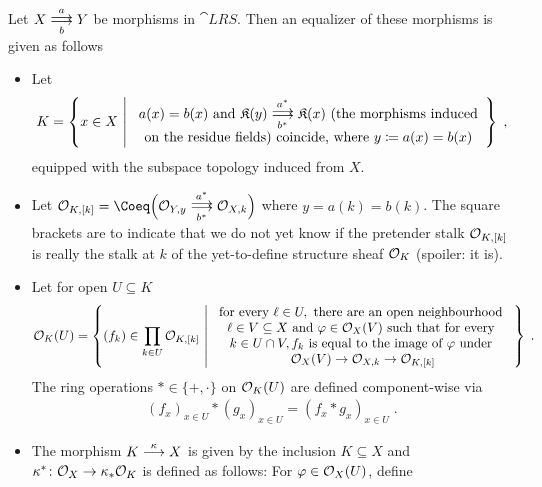 \documentclass[a4paper,parskip=half,numbers=enddot, DIV=12]{scrreprt}
\begin{document}
\begin{prop}
    Let $X\doublemorphism[a][\smash{b}] Y$ be morphisms in $\cat{LRS}$. Then an equalizer of these morphisms is given as follows
    \begin{itemize}
      \item 
        Let 
        \begin{align*}
        	K = \left\{ x\in X\st 
        	\begin{array}{c}
	        	a(x) = b(x) \text{ and }\KK(y) \doublemorphism[a^*][b^*] \KK(x)\text{ (the morphisms induced}\\
	        	\text{on the residue fields) coincide, where }y\coloneqq a(x)=b(x)
        	\end{array}\right\}\;,
        \end{align*}
        equipped with the subspace topology induced from $X$.
      \item 
        Let $\Oo_{K,[k]} = \Coeq\Big(\Oo_{Y,y} \doublemorphism[a^*][b^*] \Oo_{X,k}\Big)$ where $y=a(k) = b(k)$. The square brackets are to indicate that we do not yet know if the pretender stalk $\mathcal{O}_{K,[k]}$ is really the stalk at $k$ of the yet-to-define structure sheaf $\mathcal{O}_K$ (spoiler: it is).
      \item 
        Let for open $U\subseteq K$ 
        \begin{align*}
            \Oo_K(U) = \left\{(f_k)\in \prod_{k\in U} \Oo_{K,[k]} \st \begin{array}{c}
                \text{for every } \ell\in U, \text{ there are an open neighbourhood } \\
                \ell\in V \subseteq X \text{ and } \phi\in\Oo_X(V) \text{ such that for every } \\
                k\in U\cap V, f_k \text{ is equal to the image of }\phi\text{ under }\\
                \Oo_X(V) \morphism \Oo_{X,k} \morphism\Oo_{K,[k]}
            \end{array}
            \right\}\;.
        \end{align*}
        The ring operations $*\in\{+,\cdot\}$ on $\mathcal{O}_K(U)$ are defined component-wise via  
        \begin{align*}
            (f_x)_{x\in U} * (g_x)_{x\in U} = (f_x* g_x)_{x\in U}\;.
        \end{align*}        
        \item The morphism $K\morphism[\kappa] X$ is given by the inclusion $K\subseteq X$ and $\kappa^*\colon \Oo_X\morphism\kappa_*\Oo_K$ is defined as follows: For $\varphi\in\mathcal{O}_X(U)$, define

\end{itemize}
\end{prop}
\end{document}
